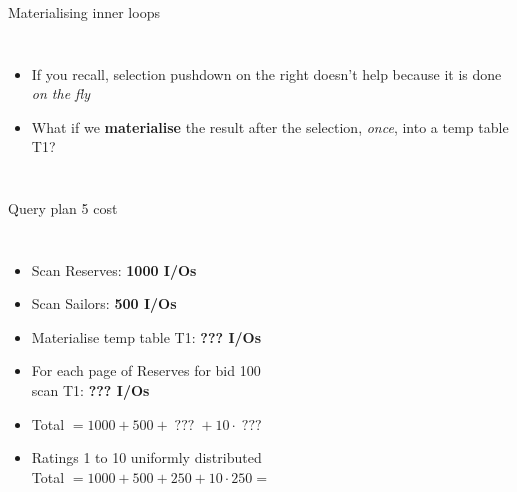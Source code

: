 \begin{frame}{Materialising inner loops }
  \begin{columns}[c]
      \begin{itemize}
        : \\
          $[\text{outer}] + [\text{inner}] + \underbrace{[T1]}_{\text{write}} + [\sigma(\text{outer})]\cdot[T1]$
        \item If you recall, selection pushdown on the right doesn't help because it is done \emph{on the fly}
        \item What if we \textbf{materialise} the result after the selection, \emph{once}, into a temp table T1?
      \end{itemize}
      \planbox{52mm}{\PlanFour}\centering{}
  \end{columns}
\end{frame}

\begin{frame}{Query plan 5 cost }
  \begin{columns}[c]
      \begin{itemize}
        \item Scan Reserves: \textbf{1000 I/Os}
        \item Scan Sailors: \textbf{500 I/Os}
        \item Materialise temp table T1: \textbf{??? I/Os}
        \item For each page of Reserves for bid 100\\ scan T1: \textbf{??? I/Os}
        \item Total $= 1000 + 500 + \;???\; + 10 \cdot \;???$
        \item Ratings 1 to 10 uniformly distributed\\
              Total $= 1000 + 500 + 250 + 10 \cdot 250 =$ 
      \end{itemize}
      \planbox[hl]{60mm}{\PlanFive}
  \end{columns}
\end{frame}


